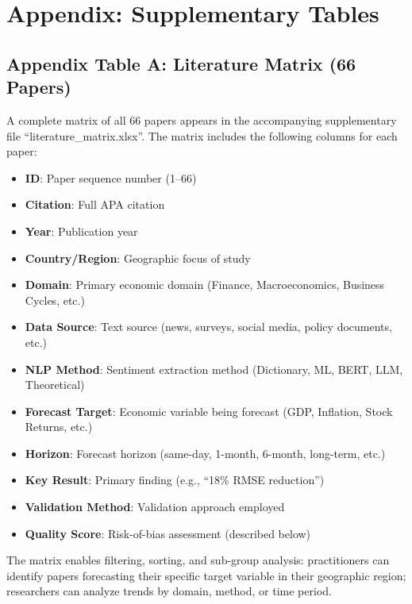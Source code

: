 
\appendix

\section{Appendix: Supplementary Tables}

\subsection*{Appendix Table A: Literature Matrix (66 Papers)}

A complete matrix of all 66 papers appears in the accompanying supplementary file ``literature_matrix.xlsx''. The matrix includes the following columns for each paper:

\begin{itemize}
\item \textbf{ID}: Paper sequence number (1--66)
\item \textbf{Citation}: Full APA citation
\item \textbf{Year}: Publication year
\item \textbf{Country/Region}: Geographic focus of study
\item \textbf{Domain}: Primary economic domain (Finance, Macroeconomics, Business Cycles, etc.)
\item \textbf{Data Source}: Text source (news, surveys, social media, policy documents, etc.)
\item \textbf{NLP Method}: Sentiment extraction method (Dictionary, ML, BERT, LLM, Theoretical)
\item \textbf{Forecast Target}: Economic variable being forecast (GDP, Inflation, Stock Returns, etc.)
\item \textbf{Horizon}: Forecast horizon (same-day, 1-month, 6-month, long-term, etc.)
\item \textbf{Key Result}: Primary finding (e.g., ``18\% RMSE reduction'')
\item \textbf{Validation Method}: Validation approach employed
\item \textbf{Quality Score}: Risk-of-bias assessment (described below)
\end{itemize}

The matrix enables filtering, sorting, and sub-group analysis: practitioners can identify papers forecasting their specific target variable in their geographic region; researchers can analyze trends by domain, method, or time period.

